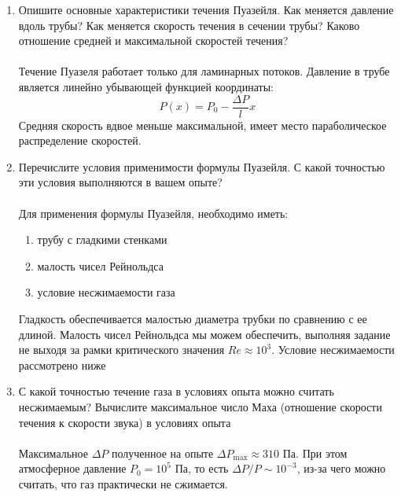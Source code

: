 \documentclass[a4paper,12pt]{article}
\begin{document}
\begin{enumerate}
\item 
Опишите основные характеристики течения Пуазейля. Как меняется давление
вдоль трубы? Как меняется скорость течения в сечении трубы? Каково отношение
средней и максимальной скоростей течения?\\\\
Течение Пуазеля работает только для ламинарных потоков. Давление в трубе является линейно убывающей функцией координаты: 
\[P(x) = P_0 - \frac{\Delta P}{l}x\]
Средняя скорость вдвое меньше максимальной, имеет место параболическое распределение скоростей. 
\item 
Перечислите условия применимости формулы Пуазейля. С какой точностью эти
условия выполняются в вашем опыте?\\\\
Для применения формулы Пуазейля, необходимо иметь:
\begin{enumerate}
\item трубу с гладкими стенками
\item малость чисел Рейнольдса
\item условие несжимаемости газа
\end{enumerate} 
Гладкость обеспечивается малостью диаметра трубки по сравнению с ее длиной. Малость чисел Рейнольдса мы можем обеспечить, выполняя задание не выходя за рамки критического значения $Re \approx 10^3$. Условие несжимаемости рассмотрено ниже
\item 
С какой точностью течение газа в условиях опыта можно считать несжимаемым?
Вычислите максимальное число Маха (отношение скорости течения к скорости звука) в условиях опыта\\\\
Максимальное $\Delta P$ полученное на опыте $\Delta P_\text{max} \approx 310$ Па. При этом атмосферное давление $P_0 = 10^5$ Па, то есть $\Delta P / P \sim 10^{-3}$, из-за чего можно считать, что газ практически не сжимается.


\end{enumerate}
\end{document}
